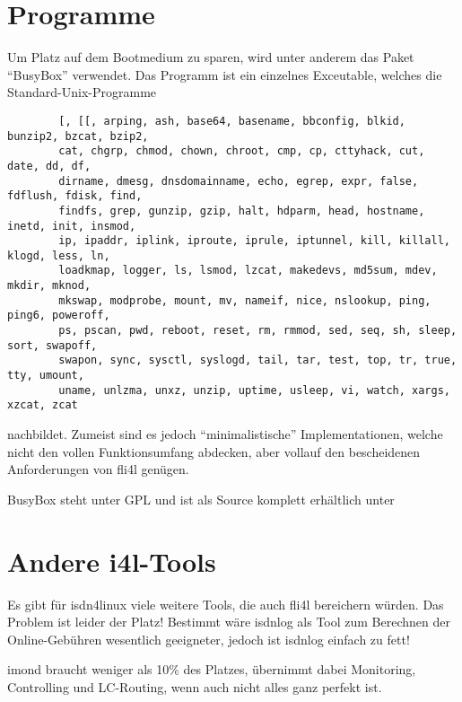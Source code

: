     \section{Programme}

    Um Platz auf dem Bootmedium zu sparen, wird unter anderem das Paket
    ``BusyBox'' verwendet. Das Programm ist ein einzelnes Exceutable,
    welches die Standard-Unix-Programme

\begin{example}
\begin{verbatim}
        [, [[, arping, ash, base64, basename, bbconfig, blkid, bunzip2, bzcat, bzip2,
        cat, chgrp, chmod, chown, chroot, cmp, cp, cttyhack, cut, date, dd, df,
        dirname, dmesg, dnsdomainname, echo, egrep, expr, false, fdflush, fdisk, find,
        findfs, grep, gunzip, gzip, halt, hdparm, head, hostname, inetd, init, insmod,
        ip, ipaddr, iplink, iproute, iprule, iptunnel, kill, killall, klogd, less, ln,
        loadkmap, logger, ls, lsmod, lzcat, makedevs, md5sum, mdev, mkdir, mknod,
        mkswap, modprobe, mount, mv, nameif, nice, nslookup, ping, ping6, poweroff,
        ps, pscan, pwd, reboot, reset, rm, rmmod, sed, seq, sh, sleep, sort, swapoff,
        swapon, sync, sysctl, syslogd, tail, tar, test, top, tr, true, tty, umount,
        uname, unlzma, unxz, unzip, uptime, usleep, vi, watch, xargs, xzcat, zcat
\end{verbatim}
\end{example}

    \noindent nachbildet. Zumeist sind es jedoch ``minimalistische''
    Implementationen, welche nicht den vollen Funktionsumfang
    abdecken, aber vollauf den bescheidenen Anforderungen von fli4l
    genügen.

    BusyBox steht unter GPL und ist als Source komplett erhältlich
    unter



    \section{Andere i4l-Tools}

    Es gibt für isdn4linux viele weitere Tools, die auch fli4l
    bereichern würden. Das Problem ist leider der Platz! Bestimmt wäre
    isdnlog als Tool zum Berechnen der Online-Gebühren wesentlich
    geeigneter, jedoch ist isdnlog einfach zu fett!

    imond braucht weniger als 10\% des Platzes, übernimmt dabei Monitoring,
    Controlling und LC-Routing, wenn auch nicht alles ganz perfekt
    ist.

